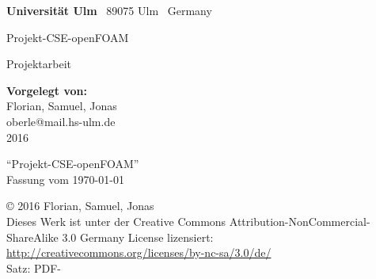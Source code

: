 \documentclass[
    a4paper,
    BCOR32mm,
    10pt,
    bibliography=totoc,
    twoside,
    openright,
    numbers=noenddot,
    headings=normal,
    DIV=9,
    parskip
]{scrbook}
\makeatletter
\newcommand{\fullname}{Florian, Samuel, Jonas}
\newcommand{\email}{oberle@mail.hs-ulm.de}
\newcommand{\titel}{Projekt-CSE-openFOAM}
\newcommand{\subtitel}{}
\newcommand{\jahr}{2016}
\newcommand{\fakultaet}{Mathematik und Wirtschaftswissenschaften}
\newcommand{\arbeit}{Projektarbeit}
\theoremstyle{marginbreak}
\makeatother
\begin{document}
\frontmatter


\thispagestyle{empty}
\begin{addmargin*}[4mm]{-32mm}
    \begin{center}
    \end{center}
    
    \vspace*{4.1em}

    \footnotesize
    \textbf{Universität Ulm} \textbar ~89075 Ulm \textbar ~Germany
    \hfill
    \vspace*{2cm}

    \parbox{140mm}{\bfseries \raggedright \huge \titel\\[1ex]
			    	\Large \subtitel}

    {\arbeit{}}
    \vspace*{4em}

    \textbf{Vorgelegt von:}\\\fullname\\\email\\[2em]
    \jahr
\end{addmargin*}


\clearpage
\thispagestyle{empty}
{
    \small \flushleft \enquote{\titel}\\
    Fassung vom \today
    \vfill


    \copyright{} \jahr{} \fullname{}\\[0.5em]
    Dieses Werk ist unter der Creative Commons Attribution-NonCommercial-ShareAlike 3.0 Germany License lizensiert: \url{http://creativecommons.org/licenses/by-nc-sa/3.0/de/}\\
    Satz: PDF-\LaTeXe{}\\
}

\tableofcontents
\end{document}
